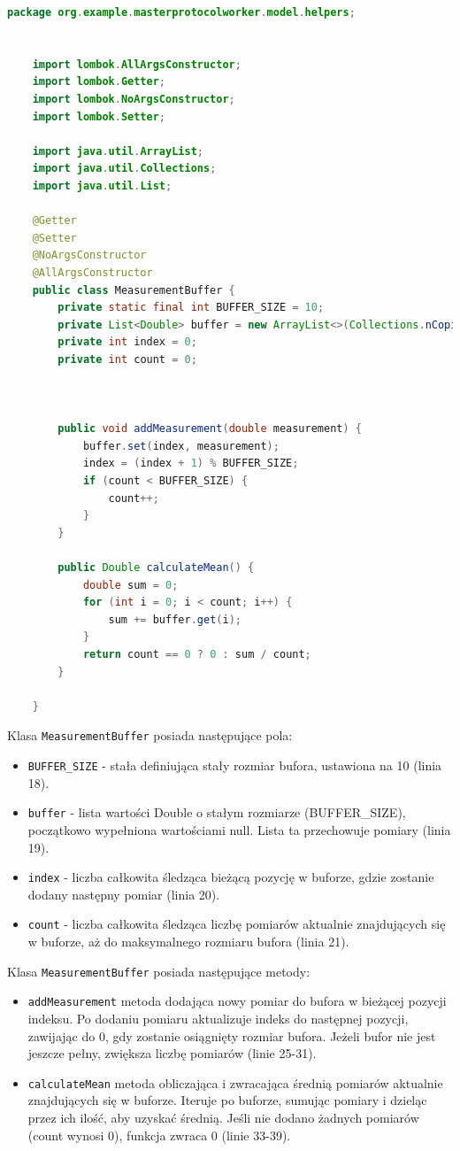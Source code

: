 \begin{lstlisting}[language=Java, caption=Kod bufora cyklicznego, label=measurementBufferCode]
    package org.example.masterprotocolworker.model.helpers;
    
    
    import lombok.AllArgsConstructor;
    import lombok.Getter;
    import lombok.NoArgsConstructor;
    import lombok.Setter;
    
    import java.util.ArrayList;
    import java.util.Collections;
    import java.util.List;
    
    @Getter
    @Setter
    @NoArgsConstructor
    @AllArgsConstructor
    public class MeasurementBuffer {
        private static final int BUFFER_SIZE = 10;
        private List<Double> buffer = new ArrayList<>(Collections.nCopies(BUFFER_SIZE, null));
        private int index = 0;
        private int count = 0;
    
    
    
        public void addMeasurement(double measurement) {
            buffer.set(index, measurement);
            index = (index + 1) % BUFFER_SIZE;
            if (count < BUFFER_SIZE) {
                count++;
            }
        }
    
        public Double calculateMean() {
            double sum = 0;
            for (int i = 0; i < count; i++) {
                sum += buffer.get(i);
            }
            return count == 0 ? 0 : sum / count;
        }
    
    }
\end{lstlisting}

Klasa \verb|MeasurementBuffer| posiada następujące pola:
\begin{itemize}
    \item \verb|BUFFER_SIZE| - stała definiująca stały rozmiar bufora, ustawiona na 10 (linia 18).
    \item \verb|buffer| - lista wartości Double o stałym rozmiarze (BUFFER\_SIZE), początkowo wypełniona wartościami null. Lista ta przechowuje pomiary (linia 19).
    \item \verb|index| - liczba całkowita śledząca bieżącą pozycję w buforze, gdzie zostanie dodany następny pomiar (linia 20).
    \item \verb|count| - liczba całkowita śledząca liczbę pomiarów aktualnie znajdujących się w buforze, aż do maksymalnego rozmiaru bufora (linia 21).
\end{itemize}

Klasa \verb|MeasurementBuffer| posiada następujące metody:
\begin{itemize}
    \item \verb|addMeasurement| metoda dodająca nowy pomiar do bufora w bieżącej pozycji indeksu. Po dodaniu pomiaru aktualizuje indeks do następnej pozycji, zawijając do 0, gdy zostanie osiągnięty rozmiar bufora. Jeżeli bufor nie jest jeszcze pełny, zwiększa liczbę pomiarów (linie 25-31).
    \item \verb|calculateMean| metoda obliczająca i zwracająca średnią pomiarów aktualnie znajdujących się w buforze. Iteruje po buforze, sumując pomiary i dzieląc przez ich ilość, aby uzyskać średnią. Jeśli nie dodano żadnych pomiarów (count wynosi 0), funkcja zwraca 0 (linie 33-39).
\end{itemize}

